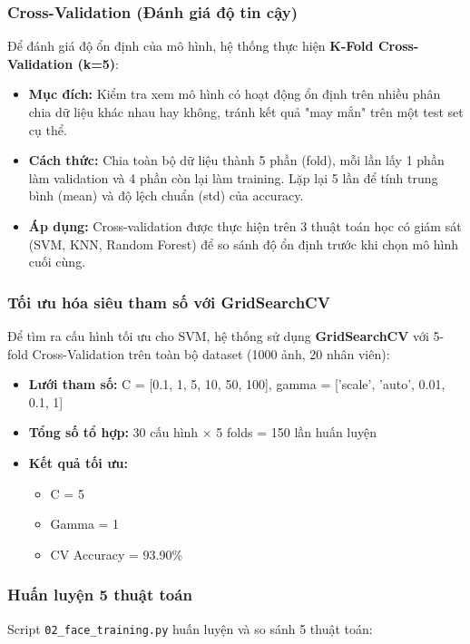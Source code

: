\documentclass[a4paper]{book}
\begin{document}
\subsubsection{Cross-Validation (Đánh giá độ tin cậy)}
Để đánh giá độ ổn định của mô hình, hệ thống thực hiện \textbf{K-Fold Cross-Validation (k=5)}:

\begin{itemize}
    \item \textbf{Mục đích:} Kiểm tra xem mô hình có hoạt động ổn định trên nhiều phân chia dữ liệu khác nhau hay không, tránh kết quả "may mắn" trên một test set cụ thể.
    
    \item \textbf{Cách thức:} Chia toàn bộ dữ liệu thành 5 phần (fold), mỗi lần lấy 1 phần làm validation và 4 phần còn lại làm training. Lặp lại 5 lần để tính trung bình (mean) và độ lệch chuẩn (std) của accuracy.
    
    \item \textbf{Áp dụng:} Cross-validation được thực hiện trên 3 thuật toán học có giám sát (SVM, KNN, Random Forest) để so sánh độ ổn định trước khi chọn mô hình cuối cùng.
\end{itemize}

\subsubsection{Tối ưu hóa siêu tham số với GridSearchCV}
Để tìm ra cấu hình tối ưu cho SVM, hệ thống sử dụng \textbf{GridSearchCV} với 5-fold Cross-Validation trên toàn bộ dataset (1000 ảnh, 20 nhân viên):

\begin{itemize}
    \item \textbf{Lưới tham số:} C = [0.1, 1, 5, 10, 50, 100], gamma = ['scale', 'auto', 0.01, 0.1, 1]
    \item \textbf{Tổng số tổ hợp:} 30 cấu hình × 5 folds = 150 lần huấn luyện
    \item \textbf{Kết quả tối ưu:} 
    \begin{itemize}
        \item C = 5
        \item Gamma = 1
        \item CV Accuracy = 93.90\%
    \end{itemize}
\end{itemize}

\subsubsection{Huấn luyện 5 thuật toán}
Script \texttt{02\_face\_training.py} huấn luyện và so sánh 5 thuật toán:
\end{document}
